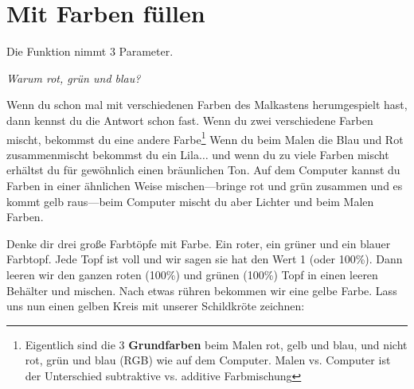 \section{Mit Farben füllen}
Die  Funktion nimmt 3 Parameter.
\par
\emph{Warum rot, grün und blau?}
\par
Wenn du schon mal mit verschiedenen Farben des Malkastens herumgespielt hast, dann kennst du die Antwort schon fast. Wenn du zwei verschiedene Farben mischt, bekommst du eine andere Farbe\footnote{Eigentlich sind die 3 \textbf{Grundfarben} beim Malen rot, gelb und blau, und nicht rot, grün und blau (RGB) wie auf dem Computer. Malen vs. Computer ist der Unterschied subtraktive vs. additive Farbmischung} Wenn du beim Malen die Blau und Rot zusammenmischt bekommst du ein Lila$\ldots$ und wenn du zu viele Farben mischt erhältst du für gewöhnlich einen bräunlichen Ton. Auf dem Computer kannst du Farben in einer ähnlichen Weise mischen---bringe rot und grün zusammen und es kommt gelb raus---beim Computer mischt du aber Lichter und beim Malen Farben.

Denke dir drei große Farbtöpfe mit Farbe. Ein roter, ein grüner und ein blauer Farbtopf. Jede Topf ist voll und wir sagen sie hat den Wert 1 (oder 100\%). Dann leeren wir den ganzen roten (100\%) und grünen (100\%) Topf in einen leeren Behälter und mischen. Nach etwas rühren bekommen wir eine gelbe Farbe. Lass uns nun einen gelben Kreis mit unserer Schildkröte zeichnen:

